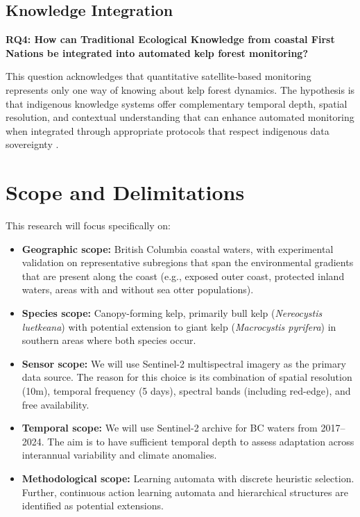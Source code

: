 \documentclass[12pt,oneside]{book}
\begin{document}
\subsection{Knowledge Integration}

\textbf{RQ4: How can Traditional Ecological Knowledge from coastal First Nations be integrated into automated kelp forest monitoring?}

This question acknowledges that quantitative satellite-based monitoring represents only one way of knowing about kelp forest dynamics. The hypothesis is that indigenous knowledge systems offer complementary temporal depth, spatial resolution, and contextual understanding that can enhance automated monitoring when integrated through appropriate protocols that respect indigenous data sovereignty \citep{Reid2021, Proulx2021}.

\section{Scope and Delimitations}
\label{sec:scope}

This research will focus specifically on:

\begin{itemize}
    \item \textbf{Geographic scope:} British Columbia coastal waters, with experimental validation on representative subregions that span the environmental gradients that are present along the coast (e.g., exposed outer coast, protected inland waters, areas with and without sea otter populations).

    \item \textbf{Species scope:} Canopy-forming kelp, primarily bull kelp (\textit{Nereocystis luetkeana}) with potential extension to giant kelp (\textit{Macrocystis pyrifera}) in southern areas where both species occur.

    \item \textbf{Sensor scope:} We will use Sentinel-2 multispectral imagery as the primary data source. The reason for this choice is its combination of spatial resolution (10m), temporal frequency (5 days), spectral bands (including red-edge), and free availability.

    \item \textbf{Temporal scope:} We will use Sentinel-2 archive for BC waters from 2017--2024. The aim is to have sufficient temporal depth to assess adaptation across interannual variability and climate anomalies.

    \item \textbf{Methodological scope:} Learning automata with discrete heuristic selection. Further, continuous action learning automata and hierarchical structures are identified as potential extensions.
\end{itemize}
\end{document}
